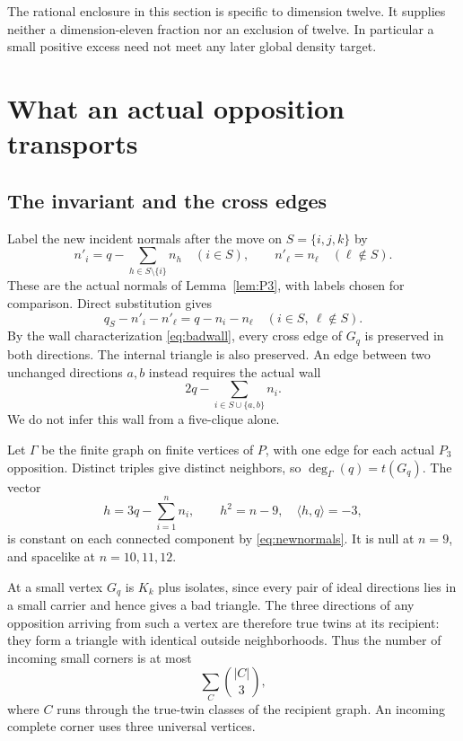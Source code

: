 \documentclass[11pt]{article}
\theoremstyle{definition}\newtheorem{definition}[theorem]{Definition}
\theoremstyle{remark}\newtheorem{remark}[theorem]{Remark}
\newcommand{\ip}[2]{\langle #1,#2\rangle}
\newcommand{\Pthree}{P_3}
\newcommand{\bin}[2]{\binom{#1}{#2}}
\begin{document}
The rational enclosure in this section is specific to dimension twelve.
It supplies neither a dimension-eleven fraction nor an exclusion of
twelve. In particular a small positive excess need not meet any later
global density target.

\section{What an actual opposition transports}
\subsection{The invariant and the cross edges}
Label the new incident normals after the move on
\(S=\{i,j,k\}\) by
\begin{equation}\label{eq:newnormals}
 n'_i=q-\sum_{h\in S\setminus\{i\}}n_h\quad(i\in S),
 \qquad n'_\ell=n_\ell\quad(\ell\notin S).
\end{equation}
These are the actual normals of Lemma~\ref{lem:P3}, with labels chosen
for comparison. Direct substitution gives
\begin{equation}\label{eq:cross}
 q_S-n'_i-n'_\ell=q-n_i-n_\ell
 \quad(i\in S,\ \ell\notin S).
\end{equation}
By the wall characterization \eqref{eq:badwall}, every cross edge of
\(G_q\) is preserved in both directions. The internal triangle is
also preserved. An edge between two unchanged directions \(a,b\)
instead requires the actual wall
\[
 2q-\sum_{i\in S\cup\{a,b\}}n_i.
\]
We do not infer this wall from a five-clique alone.

Let \(\Gamma\) be the finite graph on finite vertices of \(P\), with
one edge for each actual \(\Pthree\) opposition. Distinct triples
give distinct neighbors, so \(\deg_\Gamma(q)=t(G_q)\). The vector
\begin{equation}\label{eq:h}
 h=3q-\sum_{i=1}^n n_i,\qquad h^2=n-9,\quad \ip{h}{q}=-3,
\end{equation}
is constant on each connected component by \eqref{eq:newnormals}.
It is null at \(n=9\), and spacelike at \(n=10,11,12\).

At a small vertex \(G_q\) is \(K_k\) plus isolates, since every pair
of ideal directions lies in a small carrier and hence gives a bad
triangle. The three directions of any opposition arriving from such
a vertex are therefore true twins at its recipient: they form a
triangle with identical outside neighborhoods. Thus the number of
incoming small corners is at most
\begin{equation}\label{eq:twins}
 \sum_C\bin{|C|}{3},
\end{equation}
where \(C\) runs through the true-twin classes of the recipient graph.
An incoming complete corner uses three universal vertices.
\end{document}
